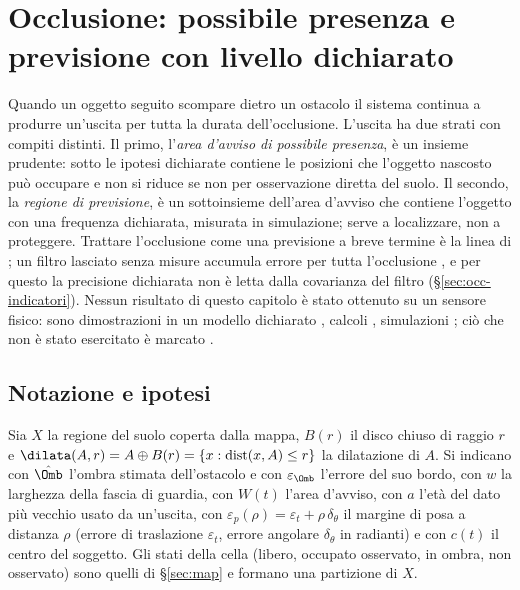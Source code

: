 \section{Occlusione: possibile presenza e previsione con livello dichiarato}\label{sec:occ}

Quando un oggetto seguito scompare dietro un ostacolo il sistema continua a produrre un'uscita per tutta la durata dell'occlusione. L'uscita ha due strati con compiti distinti. Il primo, l'\emph{area d'avviso di possibile presenza}, è un insieme prudente: sotto le ipotesi dichiarate contiene le posizioni che l'oggetto nascosto può occupare e non si riduce se non per osservazione diretta del suolo. Il secondo, la \emph{regione di previsione}, è un sottoinsieme dell'area d'avviso che contiene l'oggetto con una frequenza dichiarata, misurata in simulazione; serve a localizzare, non a proteggere. Trattare l'occlusione come una previsione a breve termine è la linea di \cite{khurana2021}; un filtro lasciato senza misure accumula errore per tutta l'occlusione \cite{cao2023}, e per questo la precisione dichiarata non è letta dalla covarianza del filtro (\S\ref{sec:occ-indicatori}). Nessun risultato di questo capitolo è stato ottenuto su un sensore fisico: sono dimostrazioni in un modello dichiarato , calcoli , simulazioni ; ciò che non è stato esercitato è marcato .

\subsection{Notazione e ipotesi}\label{sec:occ-ipotesi}

Sia $X$ la regione del suolo coperta dalla mappa, $B(r)$ il disco chiuso di raggio $r$ e $\dilata(A,r)=A\oplus B(r)=\{x:\operatorname{dist}(x,A)\le r\}$ la dilatazione di $A$. Si indicano con $\hat\Omb$ l'ombra stimata dell'ostacolo e con $\varepsilon_\Omb$ l'errore del suo bordo, con $w$ la larghezza della fascia di guardia, con $W(t)$ l'area d'avviso, con $a$ l'età del dato più vecchio usato da un'uscita, con $\varepsilon_p(\rho)=\varepsilon_t+\rho\,\delta_\theta$ il margine di posa a distanza $\rho$ (errore di traslazione $\varepsilon_t$, errore angolare $\delta_\theta$ in radianti) e con $c(t)$ il centro del soggetto. Gli stati della cella (libero, occupato osservato, in ombra, non osservato) sono quelli di \S\ref{sec:map} e formano una partizione di $X$.

